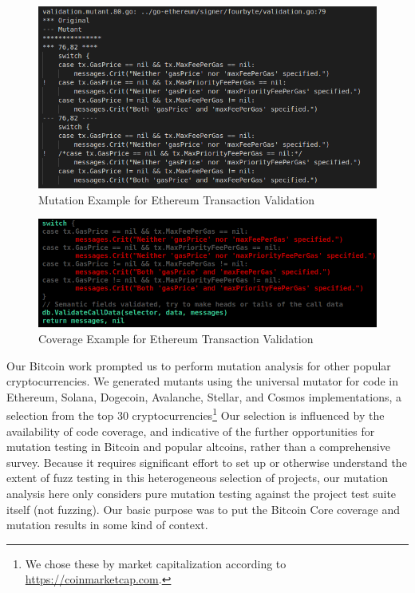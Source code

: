 \begin{figure}
\vspace{2mm}
\includegraphics[width=0.9\columnwidth]{mutation-example.png}
\caption{Mutation Example for Ethereum Transaction Validation}
\label{fig:mutation}
\end{figure}

\begin{figure}
\vspace{2mm}
\includegraphics[width=0.9\columnwidth]{coverage-example.png}
\caption{Coverage Example for Ethereum Transaction Validation}
\label{fig:coverage}
\end{figure}

Our Bitcoin work prompted us to perform mutation analysis for other popular cryptocurrencies.
We generated mutants using the universal mutator for code in Ethereum, Solana,
Dogecoin, Avalanche, Stellar, and Cosmos implementations, a selection from the top 30
cryptocurrencies\footnote{We chose these by market capitalization according to
\url{https://coinmarketcap.com}.} Our selection is influenced by the
availability of code coverage, and indicative of the further opportunities for
mutation testing in Bitcoin and popular altcoins, rather than a
comprehensive survey. Because it requires significant effort to set up or
otherwise understand the extent of fuzz testing in this heterogeneous selection
of projects, our mutation analysis here only considers pure mutation testing
against the project test suite itself (not fuzzing).  Our basic
purpose was to put the Bitcoin Core coverage and mutation results in
some kind of context.

